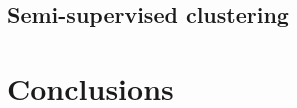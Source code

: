 \documentclass{article}
\begin{document}
\subsection{Semi-supervised clustering}



\section{Conclusions}
\label{conclusions}



\nocite{langley00} %



\end{document}
